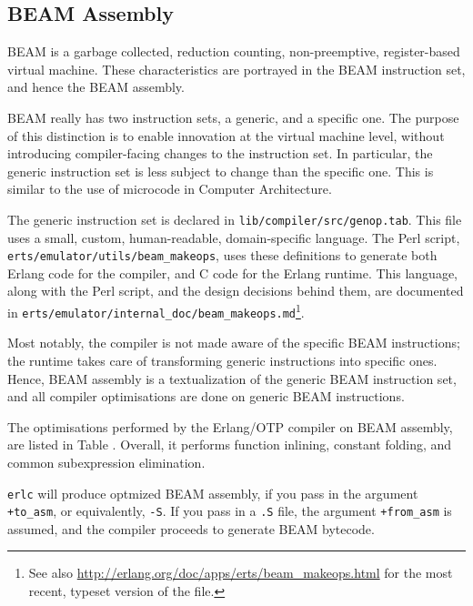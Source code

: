 \subsection{BEAM Assembly}

BEAM is a garbage collected, reduction counting, non-preemptive,
register-based virtual machine. These characteristics are portrayed in
the BEAM instruction set, and hence the BEAM assembly.

BEAM really has two instruction sets, a generic, and a specific one.
The purpose of this distinction is to enable innovation at the virtual
machine level, without introducing compiler-facing changes to the
instruction set. In particular, the generic instruction set is less
subject to change than the specific one. This is similar to the use of
microcode in Computer Architecture.

The generic instruction set is declared in
\texttt{lib/compiler/src/genop.tab}. This file uses a small, custom,
human-readable, domain-specific language. The Perl script,
\texttt{erts/emulator/utils/beam\_makeops}, uses these definitions to
generate both Erlang code for the compiler, and C code for the Erlang
runtime. This language, along with the Perl script, and the design
decisions behind them, are documented in
\texttt{erts/emulator/internal\_doc/beam\_makeops.md}\footnote{See
also \url{http://erlang.org/doc/apps/erts/beam_makeops.html} for the
most recent, typeset version of the file.}.

Most notably, the compiler is not made aware of the specific BEAM
instructions; the runtime takes care of transforming generic
instructions into specific ones. Hence, BEAM assembly is a
textualization of the generic BEAM instruction set, and all compiler
optimisations are done on generic BEAM instructions.

The optimisations performed by the Erlang/OTP compiler on BEAM
assembly, are listed in Table .
Overall, it performs function inlining, constant folding, and common
subexpression elimination.

\texttt{erlc} will produce optmized BEAM assembly, if you pass in the
argument \texttt{+to\_asm}, or equivalently, \texttt{-S}. If you pass
in a \texttt{.S} file, the argument \texttt{+from\_asm} is assumed,
and the compiler proceeds to generate BEAM bytecode.

